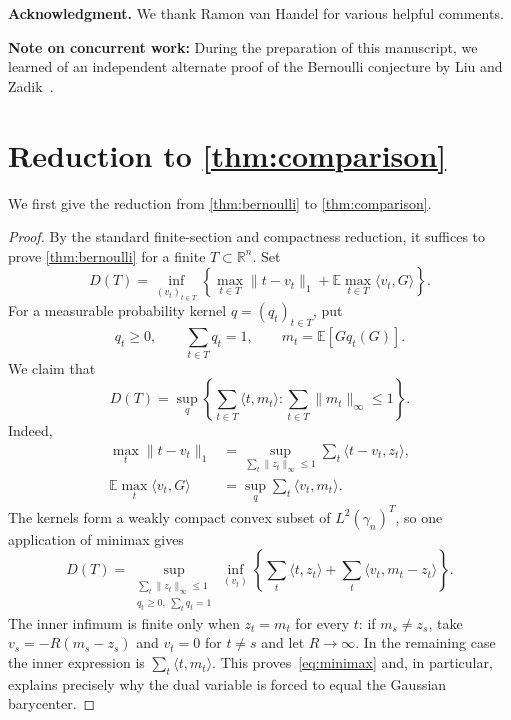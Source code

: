 \documentclass[11pt,reqno]{amsart}
\newcommand{\E}{\mathbb E}
\newcommand{\R}{\mathbb R}
\newcommand{\ip}[2]{\langle #1,#2\rangle}
\begin{document}
\smallskip
\noindent\textbf{Acknowledgment.}
We thank Ramon van Handel for various helpful comments.

\smallskip
\noindent\textbf{Note on concurrent work:}
During the preparation of this manuscript, we learned of an independent
alternate proof of the Bernoulli conjecture by Liu and
Zadik~\cite{LiuZadik}.

\section{Reduction to
  \texorpdfstring{\cref{thm:comparison}}
                 {Theorem }}
\label{sec:reduction}

We first give the reduction from \cref{thm:bernoulli} to
\cref{thm:comparison}.

\begin{proof}
By the standard finite-section and compactness reduction, it suffices to
prove \cref{thm:bernoulli} for a finite
$T\subset\R^n$. Set
\begin{equation}\label{eq:D}
 D(T)=\inf_{(v_t)_{t\in T}}
 \left\{
   \max_{t\in T}\|t-v_t\|_1
   +\E\max_{t\in T}\ip{v_t}{G}
 \right\}.
\end{equation}
For a measurable probability kernel $q=(q_t)_{t\in T}$, put
\[
 q_t\geq0,\qquad \sum_{t\in T}q_t=1,
 \qquad
 m_t=\E[Gq_t(G)].
\]
We claim that
\begin{equation}\label{eq:minimax}
 D(T)=
 \sup_{q}
 \left\{
   \sum_{t\in T}\ip{t}{m_t}:
   \sum_{t\in T}\|m_t\|_\infty\leq1
 \right\}.
\end{equation}
Indeed,
\begin{align*}
 \max_t\|t-v_t\|_1
  &=\sup_{\sum_t\|z_t\|_\infty\leq1}
      \sum_t\ip{t-v_t}{z_t},\\
 \E\max_t\ip{v_t}{G}
  &=\sup_q\sum_t\ip{v_t}{m_t}.
\end{align*}
The kernels form a weakly compact convex subset of
$L^2(\gamma_n)^{T}$, so one application of minimax gives
\[
 D(T)=
 \sup_{\substack{\sum_t\|z_t\|_\infty\leq1\\q_t\geq0,\ \sum_tq_t=1}}
 \inf_{(v_t)}
 \left\{
   \sum_t\ip{t}{z_t}
   +\sum_t\ip{v_t}{m_t-z_t}
 \right\}.
\]
The inner infimum is finite only when $z_t=m_t$ for every $t$:
if $m_s\ne z_s$, take
$v_s=-R(m_s-z_s)$ and $v_t=0$ for $t\ne s$ and let
$R\to\infty$. In the remaining case the inner expression is
$\sum_t\ip{t}{m_t}$. This proves~\eqref{eq:minimax} and, in
particular, explains precisely why the dual variable is forced to equal
the Gaussian barycenter.


\end{proof}
\end{document}
